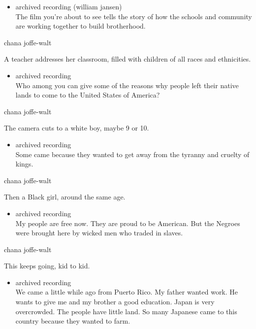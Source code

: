\begin{itemize}
\tightlist
\item
  archived recording (william jansen)\\
  The film you're about to see tells the story of how the schools and
  community are working together to build brotherhood.
\end{itemize}

chana joffe-walt

A teacher addresses her classroom, filled with children of all races and
ethnicities.

\begin{itemize}
\tightlist
\item
  archived recording\\
  Who among you can give some of the reasons why people left their
  native lands to come to the United States of America?
\end{itemize}

chana joffe-walt

The camera cuts to a white boy, maybe 9 or 10.

\begin{itemize}
\tightlist
\item
  archived recording\\
  Some came because they wanted to get away from the tyranny and cruelty
  of kings.
\end{itemize}

chana joffe-walt

Then a Black girl, around the same age.

\begin{itemize}
\tightlist
\item
  archived recording\\
  My people are free now. They are proud to be American. But the Negroes
  were brought here by wicked men who traded in slaves.
\end{itemize}

chana joffe-walt

This keeps going, kid to kid.

\begin{itemize}
\tightlist
\item
  archived recording\\
  We came a little while ago from Puerto Rico. My father wanted work. He
  wants to give me and my brother a good education. Japan is very
  overcrowded. The people have little land. So many Japanese came to
  this country because they wanted to farm.
\end{itemize}

